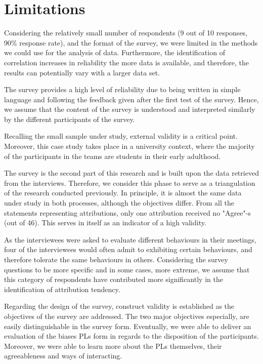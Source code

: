 
\section{Limitations} \label{chapt5:Limitations}

Considering the relatively small number of respondents (9 out of 10 responses, 90\% response rate), and the format of the survey, we were limited in the methods we could use for the analysis of data. Furthermore, the identification of correlation increases in reliability the more data is available, and therefore, the results can potentially vary with a larger data set.

The survey provides a high level of reliability due to being written in simple language and following the feedback given after the first test of the survey. Hence, we assume that the content of the survey is understood and interpreted similarly by the different participants of the survey. 

Recalling the small sample under study, external validity is a critical point. Moreover, this case study takes place in a university context, where the majority of the participants in the teams are students in their early adulthood.

The survey is the second part of this research and is built upon the data retrieved from the interviews. Therefore, we consider this phase to serve as a triangulation of the research conducted previously. In principle, it is almost the same data under study in both processes, although the objectives differ. From all the statements representing attributions, only one attribution received no "Agree"-s (out of 46). This serves in itself as an indicator of a high validity.

As the interviewees were asked to evaluate different behaviours in their meetings, four of the interviewees would often admit to exhibiting certain behaviours, and therefore tolerate the same behaviours in others. Considering the survey questions to be more specific and in some cases, more extreme, we assume that this category of respondents have contributed more significantly in the identification of attribution tendency.

Regarding the design of the survey, construct validity is established as the objectives of the survey are addressed. The two major objectives especially, are easily distinguishable in the survey form. Eventually, we were able to deliver an evaluation of the biases PLs form in regards to the disposition of the participants. Moreover, we were able to learn more about the PLs themselves, their agreeableness and ways of interacting.

